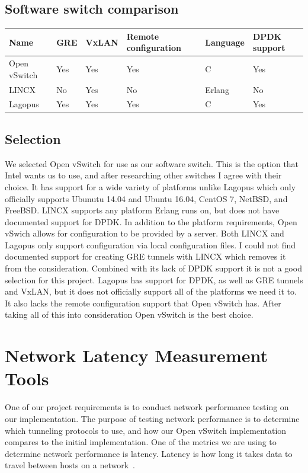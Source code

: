 \documentclass[10pt,letterpaper,onecolumn,draftclsnofoot]{IEEEtran}
\begin{document}
\subsection{Software switch comparison}

\begin{center}
	\begin{tabular}{| l | l | l | l | l | l |}
		\hline
		Name & GRE & VxLAN & Remote configuration & Language & DPDK support  \\ \hline
		Open vSwitch & Yes & Yes & Yes & C & Yes \\ \hline
		LINCX & No & Yes & No & Erlang & No \\ \hline
		Lagopus & Yes & Yes & Yes & C & Yes \\ \hline
	\end{tabular}
\end{center}

\subsection{Selection}
We selected Open vSwitch for use as our software switch. 
This is the option that Intel wants us to use, and after researching other switches I agree with their choice.
It has support for a wide variety of platforms unlike Lagopus which only officially supports Ubunutu 14.04 and Ubuntu 16.04, CentOS 7, NetBSD, and FreeBSD.
LINCX supports any platform Erlang runs on, but does not have documented support for DPDK.
In addition to the platform requirements, Open vSwich allows for configuration to be provided by a server.
Both LINCX and Lagopus only support configuration via local configuration files.
I could not find documented support for creating GRE tunnels with LINCX which removes it from the consideration.
Combined with its lack of DPDK support it is not a good selection for this project.
Lagopus has support for DPDK, as well as GRE tunnels and VxLAN, but it does not officially support all of the platforms we need it to. 
It also lacks the remote configuration support that Open vSwitch has.
After taking all of this into consideration Open vSwitch is the best choice.


\section{Network Latency Measurement Tools}
One of our project requirements is to conduct network performance testing on our implementation.
The purpose of testing network performance is to determine which tunneling protocols to use, 
and how our Open vSwitch implementation compares to the initial implementation.
One of the metrics we are using to determine network performance is latency.
Latency is how long it takes data to travel between hosts on a network~\cite{topdown-ssl}.
\end{document}
